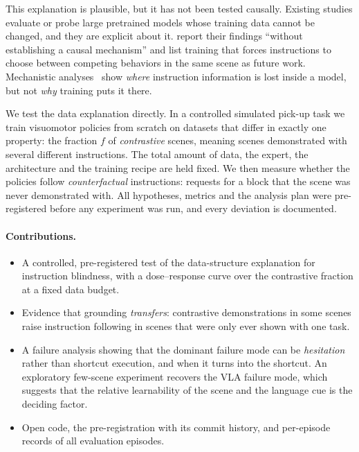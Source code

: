 \documentclass[11pt]{article}
\begin{document}
This explanation is plausible, but it has not been tested causally. Existing studies evaluate or
probe large pretrained models whose training data cannot be changed, and they are explicit about
it. \citet{jiang2026encoded} report their findings ``without establishing a causal mechanism'' and
list training that forces instructions to choose between competing behaviors in the same scene as
future work. Mechanistic analyses~\citep{wulff2026mechanistic,jiang2026encoded} show \emph{where}
instruction information is lost inside a model, but not \emph{why} training puts it there.

We test the data explanation directly. In a controlled simulated pick-up task we train
visuomotor policies from scratch on datasets that differ in exactly one property: the fraction
$f$ of \emph{contrastive} scenes, meaning scenes demonstrated with several different instructions.
The total amount of data, the expert, the architecture and the training recipe are held fixed.
We then measure whether the policies follow \emph{counterfactual} instructions: requests for a block
that the scene was never demonstrated with. All hypotheses, metrics and the analysis plan were
pre-registered before any experiment was run, and every deviation is documented.

\paragraph{Contributions.}
\begin{itemize}
\item A controlled, pre-registered test of the data-structure explanation for instruction
blindness, with a dose--response curve over the contrastive fraction at a fixed data budget.
\item Evidence that grounding \emph{transfers}: contrastive demonstrations in some scenes raise
instruction following in scenes that were only ever shown with one task.
\item A failure analysis showing that the dominant failure mode can be \emph{hesitation} rather
than shortcut execution, and when it turns into the shortcut. An exploratory few-scene experiment
recovers the VLA failure mode, which suggests that the relative learnability of the scene and the
language cue is the deciding factor.
\item Open code, the pre-registration with its commit history, and per-episode records of all
evaluation episodes.
\end{itemize}
\end{document}
